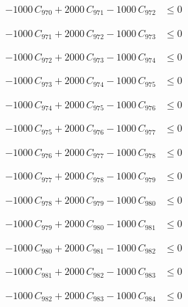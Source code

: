\documentclass[a4paper,11pt]{article}
\begin{document}
\begin{align}
-1000\,C_{970} + 2000\,C_{971} - 1000\,C_{972} &\leq 0 \nonumber
\end{align}

\begin{align}
-1000\,C_{971} + 2000\,C_{972} - 1000\,C_{973} &\leq 0 \nonumber
\end{align}

\begin{align}
-1000\,C_{972} + 2000\,C_{973} - 1000\,C_{974} &\leq 0 \nonumber
\end{align}

\begin{align}
-1000\,C_{973} + 2000\,C_{974} - 1000\,C_{975} &\leq 0 \nonumber
\end{align}

\begin{align}
-1000\,C_{974} + 2000\,C_{975} - 1000\,C_{976} &\leq 0 \nonumber
\end{align}

\begin{align}
-1000\,C_{975} + 2000\,C_{976} - 1000\,C_{977} &\leq 0 \nonumber
\end{align}

\begin{align}
-1000\,C_{976} + 2000\,C_{977} - 1000\,C_{978} &\leq 0 \nonumber
\end{align}

\begin{align}
-1000\,C_{977} + 2000\,C_{978} - 1000\,C_{979} &\leq 0 \nonumber
\end{align}

\begin{align}
-1000\,C_{978} + 2000\,C_{979} - 1000\,C_{980} &\leq 0 \nonumber
\end{align}

\begin{align}
-1000\,C_{979} + 2000\,C_{980} - 1000\,C_{981} &\leq 0 \nonumber
\end{align}

\begin{align}
-1000\,C_{980} + 2000\,C_{981} - 1000\,C_{982} &\leq 0 \nonumber
\end{align}

\begin{align}
-1000\,C_{981} + 2000\,C_{982} - 1000\,C_{983} &\leq 0 \nonumber
\end{align}

\begin{align}
-1000\,C_{982} + 2000\,C_{983} - 1000\,C_{984} &\leq 0 \nonumber
\end{align}
\end{document}
